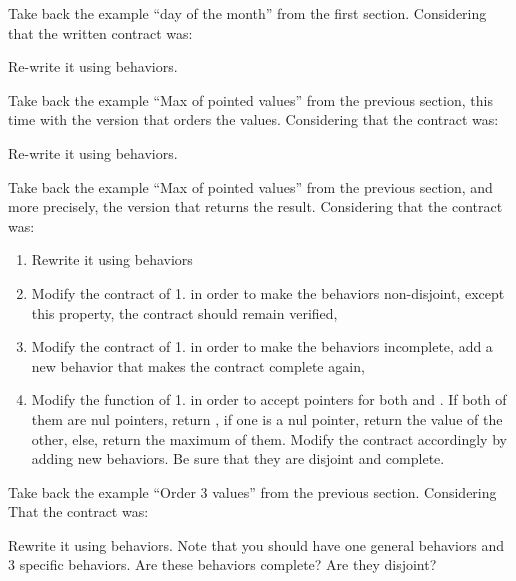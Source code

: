 Take back the example ``day of the month'' from the first section.
Considering that the written contract was:





Re-write it using behaviors.





Take back the example ``Max of pointed values'' from the previous section,
this time with the version that orders the values. Considering that the
contract was:






Re-write it using behaviors.






Take back the example ``Max of pointed values'' from the previous section,
and more precisely, the version that returns the result. Considering that
the contract was:






\begin{enumerate}
\item Rewrite it using behaviors
\item Modify the contract of 1. in order to make the behaviors non-disjoint,
  except this property, the contract should remain verified,
\item Modify the contract of 1. in order to make the behaviors incomplete,
  add a new behavior that makes the contract complete again,
\item Modify the function of 1. in order to accept  pointers
  for both  and . If both of them are nul pointers,
  return , if one is a nul pointer, return the value of
  the other, else, return the maximum of them. Modify the contract accordingly
  by adding new behaviors. Be sure that they are disjoint and complete.
\end{enumerate}




Take back the example ``Order 3 values'' from the previous section. Considering
That the contract was:




Rewrite it using behaviors. Note that you should have one general behaviors
and 3 specific behaviors. Are these behaviors complete? Are they disjoint?
